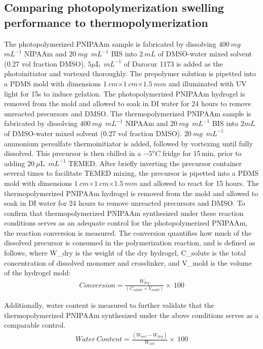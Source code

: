 \subsection{Comparing photopolymerization swelling performance to thermopolymerization}
The photopolymerized PNIPAAm sample is fabricated by dissolving $400~mg$~$mL^{-1}$ NIPAAm and $20~mg$~$mL^{-1}$ BIS into $2~mL$ of DMSO-water mixed solvent (0.27 vol fraction DMSO). $5\mu$L~$mL^{-1}$ of Darocur 1173 is added as the photoinitiator and vortexed thoroughly. The prepolymer solution is pipetted into a PDMS mold with dimensions $1~cm$$\times$$1~cm$$\times$$1.5~mm$ and illuminated with UV light for 15s to induce gelation. The photopolymerized PNIPAAm hydrogel is removed from the mold and allowed to soak in DI water for 24 hours to remove unreacted precursors and DMSO. The thermopolymerized PNIPAAm sample is fabricated by dissolving $400~mg$~$mL^{-1}$ NIPAAm and $20~mg$~$mL^{-1}$ BIS into $2mL$ of DMSO-water mixed solvent (0.27 vol fraction DMSO). $20~mg$~$mL^{-1}$ ammonium persulfate thermoinitiator is added, followed by vortexing until fully dissolved. This precursor is then chilled in a $-5^{o}C$ fridge for 15\,min, prior to adding $20~\mu$L~$mL^{-1}$ TEMED. After briefly inverting the precursor container several times to facilitate TEMED mixing, the precursor is pipetted into a PDMS mold with dimensions $1~cm$$\times$$1~cm$$\times$$1.5~mm$ and allowed to react for 15 hours. The thermopolymerized PNIPAAm hydrogel is removed from the mold and allowed to soak in DI water for 24 hours to remove unreacted precursors and DMSO.
To confirm that thermopolymerized PNIPAAm synthesized under these reaction conditions serves as an adequate control for the photopolymerized PNIPAAm, the reaction conversion is measured. The conversion quantifies how much of the dissolved precursor is consumed in the polymerization reaction, and is defined as follows, where W_dry  is the weight of the dry hydrogel, C_solute  is the total concentration of dissolved monomer and crosslinker, and V_mold  is the volume of the hydrogel mold:
\begin{align}
	Conversion = \frac{W_{dry}}{(C_{solute}×V_{mold} )}\times~100
\end{align}

Additionally, water content is measured to further validate that the thermopolymerized PNIPAAm synthesized under the above conditions serves as a comparable control. 
\begin{align}
	Water~Content = \frac{(W_{wet}-W_{dry})}{W_{wet}}\times~100
\end{align}

